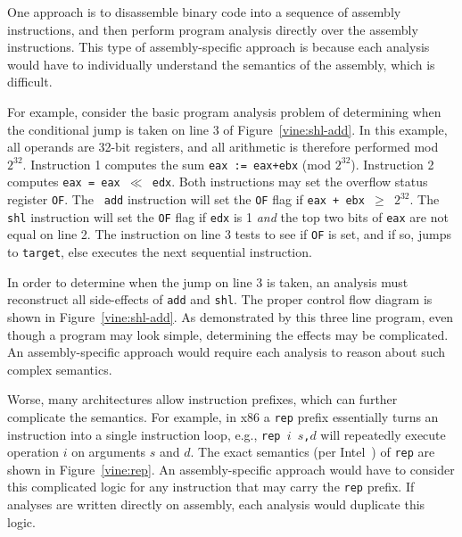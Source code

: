 One approach is to disassemble binary code into a sequence of assembly
instructions, and then perform program analysis directly over the
assembly instructions.  This type of assembly-specific approach is
\naive because each analysis would have to individually understand the
semantics of the assembly, which is difficult.

For example, consider the basic program analysis problem of
determining when the conditional jump is taken on line 3 of
Figure~\ref{vine:shl-add}. In this example, all operands are 32-bit
registers, and all arithmetic is therefore performed mod
$2^{32}$. Instruction 1 computes the sum {\tt eax := eax+ebx} (mod
$2^{32}$).  Instruction 2 computes {\tt eax = eax $\ll$ edx}.  Both
instructions may set the overflow status register {\tt OF}. The {\tt
  add} instruction will set the {\tt OF} flag if {\tt eax + ebx $\geq$
  $2^{32}$}.  The {\tt shl} instruction will set the {\tt OF} flag if
{\tt edx} is 1 \emph{and} the top two bits of {\tt eax} are not equal
on line 2. The instruction on line 3 tests to see if {\tt OF} is set,
and if so, jumps to {\tt target}, else executes the next sequential
instruction. 

In order to determine when the jump on line 3 is taken, an analysis
must reconstruct all side-effects of {\tt add} and {\tt shl}.  The
proper control flow diagram is shown in Figure~\ref{vine:shl-add}.  As
demonstrated by this three line program, even though a program may
look simple, determining the effects may be complicated. An
assembly-specific approach would require each analysis to reason about
such complex semantics.


Worse, many architectures allow instruction prefixes, which can
further complicate the semantics. For example, in x86 a {\tt rep}
prefix essentially turns an instruction into a single instruction
loop, e.g., {\tt rep $i$ $s$,$d$} will repeatedly execute operation
$i$ on arguments $s$ and $d$.  The exact semantics (per
Intel~\cite{intel:x86}) of {\tt rep} are shown in
Figure~\ref{vine:rep}. An assembly-specific approach would have to
consider this complicated logic for any instruction that may carry the
{\tt rep} prefix. If analyses are written directly on assembly, each
analysis would duplicate this logic.


